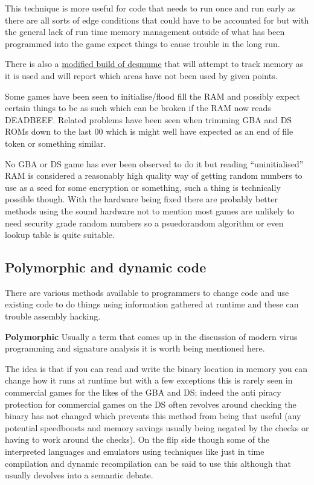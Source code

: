 \documentclass[
]{book}
\begin{document}
This technique is more useful for code that needs to run once and run early as there are all sorts of edge conditions that could have to be accounted for but with the general lack of run time memory management outside of what has been programmed into the game expect things to cause trouble in the long run.

There is also a \href{http://gbatemp.net/threads/unofficial-desmume-build-unused-memory-finder-tool.349332/}{modified build of desmume} that will attempt to track memory as it is used and will report which areas have not been used by given points.

Some games have been seen to initialise/flood fill the RAM and possibly expect certain things to be as such which can be broken if the RAM now reads DEADBEEF. Related problems have been seen when trimming GBA and DS ROMs down to the last 00 which is might well have expected as an end of file token or something similar.

No GBA or DS game has ever been observed to do it but reading ``uninitialised'' RAM is considered a reasonably high quality way of getting random numbers to use as a seed for some encryption or something, such a thing is technically possible though. With the hardware being fixed there are probably better methods using the sound hardware not to mention most games are unlikely to need security grade random numbers so a psuedorandom algorithm or even lookup table is quite suitable.

\hypertarget{polymorphic-and-dynamic-code}{%
\subsection{Polymorphic and dynamic code}\label{polymorphic-and-dynamic-code}}

There are various methods available to programmers to change code and use existing code to do things using information gathered at runtime and these can trouble assembly hacking.

\textbf{Polymorphic} Usually a term that comes up in the discussion of modern virus programming and signature analysis it is worth being mentioned here.

The idea is that if you can read and write the binary location in memory you can change how it runs at runtime but with a few exceptions this is rarely seen in commercial games for the likes of the GBA and DS; indeed the anti piracy protection for commercial games on the DS often revolves around checking the binary has not changed which prevents this method from being that useful (any potential speedboosts and memory savings usually being negated by the checks or having to work around the checks). On the flip side though some of the interpreted languages and emulators using techniques like just in time compilation and dynamic recompilation can be said to use this although that usually devolves into a semantic debate.
\end{document}
